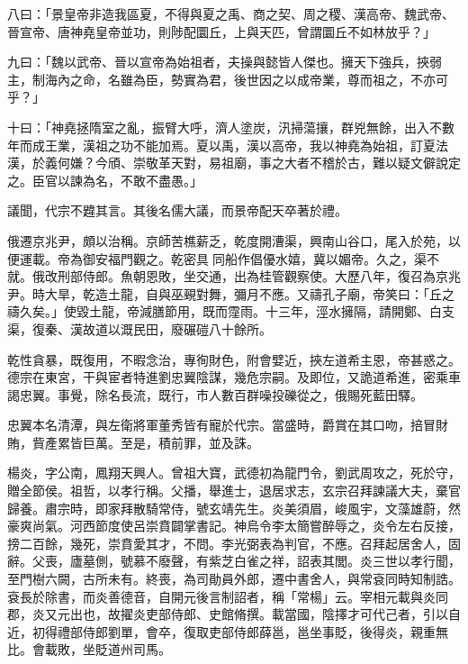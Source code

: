 \begin{pinyinscope}
 八曰：「景皇帝非造我區夏，不得與夏之禹、商之契、周之稷、漢高帝、魏武帝、晉宣帝、唐神堯皇帝並功，則陟配圜丘，上與天匹，曾謂圜丘不如林放乎？」



 九曰：「魏以武帝、晉以宣帝為始祖者，夫操與懿皆人傑也。擁天下強兵，挾弱主，制海內之命，名雖為臣，勢實為君，後世因之以成帝業，尊而祖之，不亦可乎？」



 十曰：「神堯拯隋室之亂，振臂大呼，濟人塗炭，汛掃蕩攘，群兇無餘，出入不數年而成王業，漢祖之功不能加焉。夏以禹，漢以高帝，我以神堯為始祖，訂夏法漢，於義何嫌？今頎、崇敬革天對，易祖廟，事之大者不稽於古，難以疑文僻說定之。臣官以諫為名，不敢不盡愚。」



 議聞，代宗不韙其言。其後名儒大議，而景帝配天卒著於禮。



 俄遷京兆尹，頗以治稱。京師苦樵薪乏，乾度開漕渠，興南山谷口，尾入於苑，以便運載。帝為御安福門觀之。乾密具同船作倡優水嬉，冀以媚帝。久之，渠不就。俄改刑部侍郎。魚朝恩敗，坐交通，出為桂管觀察使。大歷八年，復召為京兆尹。時大旱，乾造土龍，自與巫覡對舞，彌月不應。又禱孔子廟，帝笑曰：「丘之禱久矣。」使毀土龍，帝減膳節用，既而霪雨。十三年，涇水擁隔，請開鄭、白支渠，復秦、漢故道以溉民田，廢碾磑八十餘所。



 乾性貪暴，既復用，不暇念治，專徇財色，附會嬖近，挾左道希主恩，帝甚惑之。德宗在東宮，干與宦者特進劉忠翼陰謀，幾危宗嗣。及即位，又詭道希進，密乘車謁忠翼。事覺，除名長流，既行，市人數百群噪投礫從之，俄賜死藍田驛。



 忠翼本名清潭，與左衛將軍董秀皆有寵於代宗。當盛時，爵賞在其口吻，掊冒財賄，貲產累皆巨萬。至是，積前罪，並及誅。



 楊炎，字公南，鳳翔天興人。曾祖大寶，武德初為龍門令，劉武周攻之，死於守，贈全節侯。祖哲，以孝行稱。父播，舉進士，退居求志，玄宗召拜諫議大夫，棄官歸養。肅宗時，即家拜散騎常侍，號玄靖先生。炎美須眉，峻風宇，文藻雄蔚，然豪爽尚氣。河西節度使呂崇賁闢掌書記。神烏令李太簡嘗醉辱之，炎令左右反接，搒二百餘，幾死，崇賁愛其才，不問。李光弼表為判官，不應。召拜起居舍人，固辭。父喪，廬墓側，號慕不廢聲，有紫芝白雀之祥，詔表其閭。炎三世以孝行聞，至門樹六闕，古所未有。終喪，為司勛員外郎，遷中書舍人，與常袞同時知制誥。袞長於除書，而炎善德音，自開元後言制詔者，稱「常楊」云。宰相元載與炎同郡，炎又元出也，故擢炎吏部侍郎、史館脩撰。載當國，陰擇才可代己者，引以自近，初得禮部侍郎劉單，會卒，復取吏部侍郎薛邕，邕坐事貶，後得炎，親重無比。會載敗，坐貶道州司馬。




\end{pinyinscope}
